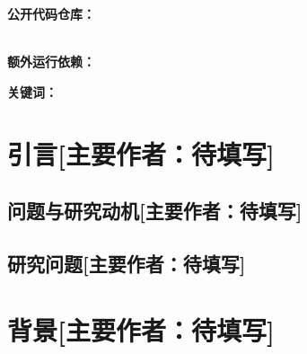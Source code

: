 \documentclass[UTF8,11pt,a4paper,fontset=none]{ctexart}
\title{\todoitem{报告标题}}
\author{
  \todoitem{成员姓名 1}\quad
  \todoitem{成员姓名 2}\quad
  \todoitem{成员姓名 3}\\
  \small Machine Learning Essentials, Summer Semester 2026
}
\date{\today}
\newcommand{\primaryauthor}[1]{\texorpdfstring{\enspace\normalfont\small[主要作者：#1]}{ [主要作者：#1]}}
\newcommand{\authorsection}[2]{\section{#1\primaryauthor{#2}}}
\newcommand{\authorsubsection}[2]{\subsection{#1\primaryauthor{#2}}}
\newcommand{\pendingauthor}{待填写}
\newif\ifdraftguidance
\newcommand{\writingnote}[1]{%
  \ifdraftguidance
    \par\noindent\begingroup\color{promptblue}\small
    \fbox{\begin{minipage}{0.94\linewidth}\textbf{写作提示：}#1\end{minipage}}%
    \par\endgroup
  \fi
}
\newcommand{\todoitem}[1]{%
  \ifdraftguidance\textcolor{promptblue}{\textbf{[待补：#1]}}\fi
}
\begin{document}
\maketitle

\writingnote{提交前确认课程是否接受中文及其字数折算规则。课程要求的总篇幅约为每名成员 4,000 English words，且不应明显超出。报告中不要使用大学 Logo。}

\begin{center}
  \textbf{公开代码仓库：}\todoitem{公开仓库 URL}\\
  \textbf{额外运行依赖：}\todoitem{没有则写“无”；有则列名称与版本}
\end{center}

\begin{abstract}
\writingnote{用一段自洽文字概括大纲中的研究问题、三条模型路线、统一冻结评估方法、最重要的定量结果，以及为什么最终选择 B33。最后写清结论只适用于已运行协议；不要引用文献，也不要加入正文未报告的结果。}
\todoitem{摘要正文}
\end{abstract}

\noindent\textbf{关键词：}\todoitem{3--5 个关键词}

\tableofcontents
\clearpage

\writingnote{提交检查：摘要和 Background 使用完整正文，不保留提示或示意图占位；报告开头列出最终 Agent 的 NumPy 与 PyTorch 版本；所有标题填写真实主要作者；所有数字可追溯到 report-assets/tables/*.csv 或其 source\_path；not\_reported 和 unrun 不转换为 0；报告 PDF 不上传公开仓库；团队成员须理解、核验并以自己的表达修订 AI 辅助初稿。}

\authorsection{引言}{\pendingauthor}

\authorsubsection{问题与研究动机}{\pendingauthor}
\writingnote{说明稀疏反馈、延迟炸弹信用、目标重选和对手不确定性；强调训练 reward 不等于冻结游戏表现，得分、安全和 0.5 秒 CPU 时限共同决定选模。}
\todoitem{正文}

\authorsubsection{研究问题}{\pendingauthor}
\writingnote{依次回答：不同价值学习方法能否学会金币导航并迁移到炸箱和对战；等待、循环、自杀和目标丢失分别能由哪些特征、奖励和生存约束改善；三条路线的主要瓶颈及哪些改进有效、无效或证据不足；在得分、生存、推理时间和可复现性之间为什么最终选择 B33。}
\todoitem{正文}

\authorsection{背景}{\pendingauthor}
\writingnote{描述 Bomberman 环境与 Task 1--4；概述 Q-learning、Double Q、DQN、Double DQN、dueling、PER、n-step 与蒸馏；介绍离散、tile-coded 连续、MLP 连续和 17 通道空间表示；说明奖励塑形、课程学习与安全动作准入。}
\todoitem{正文}
\end{document}
